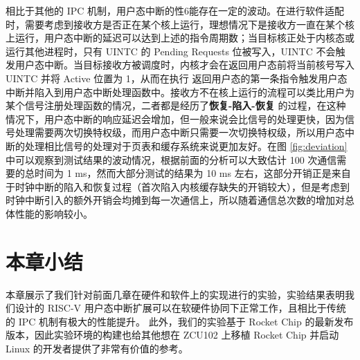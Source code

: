 相比于其他的 IPC 机制，用户态中断的性6能存在一定的波动。在进行软件适配时，需要考虑到接收方是否正在某个核上运行，理想情况下是接收方一直在某个核上运行，用户态中断的延迟可以达到上述的指令周期数；当目标核正处于内核态或运行其他进程时，只有 UINTC 的 Pending Requests 位被写入，UINTC 不会触发用户态中断。当目标接收方被调度时，内核才会在返回用户态前将当前核号写入 UINTC 并将 Active 位置为 1，从而在执行 \Isret 返回用户态的第一条指令触发用户态中断并陷入到用户态中断处理函数中。接收方不在核上运行的流程可以类比用户为某个信号注册处理函数的情况，二者都是经历了\textbf{恢复-陷入-恢复} 的过程，在这种情况下，用户态中断的响应延迟会增加，但一般来说会比信号的处理更快，因为信号处理需要两次切换特权级，而用户态中断只需要一次切换特权级，所以用户态中断的处理相比信号的处理对于页表和缓存系统来说更加友好。在图 \ref{fig:deviation} 中可以观察到测试结果的波动情况，根据前面的分析可以大致估计 100 次通信需要的总时间为 1 ms，然而大部分测试的结果为 10 ms 左右，这部分开销正是来自于时钟中断的陷入和恢复过程（首次陷入内核缓存缺失的开销较大），但是考虑到时钟中断引入的额外开销会均摊到每一次通信上，所以随着通信总次数的增加对总体性能的影响较小。

\section{本章小结}

本章展示了我们针对前面几章在硬件和软件上的实现进行的实验，实验结果表明我们设计的 RISC-V 用户态中断扩展可以在软硬件协同下正常工作，且相比于传统的 IPC 机制有极大的性能提升。 此外，我们的实验基于 Rocket Chip 的最新发布版本，因此实验环境的构建也给其他想在 ZCU102 上移植 Rocket Chip 并启动 Linux 的开发者提供了非常有价值的参考。